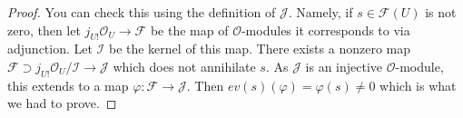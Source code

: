 \documentclass[10pt,a4paper]{amsart}
\theoremstyle{plain}
\theoremstyle{definition}
\theoremstyle{remark}
\numberwithin{equation}{subsection}
\begin{document}
\begin{proof}
You can check this using the definition of $\mathcal{J}$.
Namely, if $s \in \mathcal{F}(U)$ is not zero, then let
$j_{U!}\mathcal{O}_U \to \mathcal{F}$ be the map of
$\mathcal{O}$-modules it corresponds to via adjunction.
Let $\mathcal{I}$ be the kernel of this map. There exists
a nonzero map $\mathcal{F} \supset j_{U!}\mathcal{O}_U/\mathcal{I}
\to \mathcal{J}$ which does not annihilate $s$. As $\mathcal{J}$ is
an injective $\mathcal{O}$-module, this extends to a map
$\varphi : \mathcal{F} \to \mathcal{J}$.
Then $ev(s)(\varphi) = \varphi(s) \not = 0$ which is what we had to prove.
\end{proof}
\end{document}
